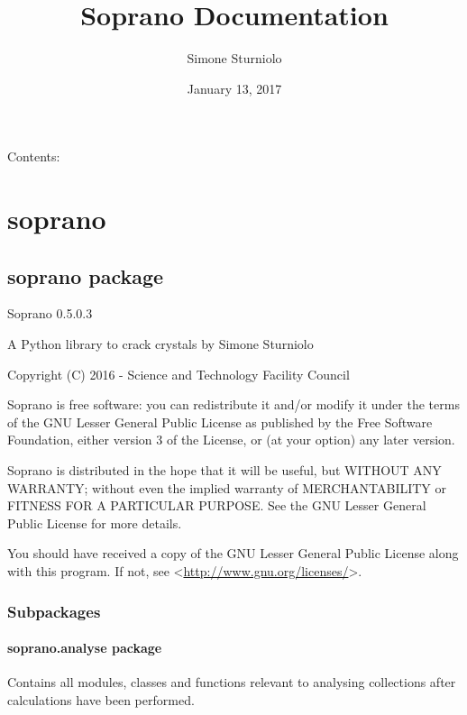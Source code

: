 \documentclass[letterpaper,10pt,english]{sphinxmanual}
\title{Soprano Documentation}
\date{January 13, 2017}
\author{Simone Sturniolo}
\begin{document}
\maketitle
\tableofcontents
{}\label{index::doc}


Contents:


\chapter{soprano}
\label{doctree/modules:welcome-to-soprano-s-documentation-release-release}\label{doctree/modules:soprano}\label{doctree/modules::doc}

\section{soprano package}
\label{doctree/soprano:module-soprano}\label{doctree/soprano::doc}\label{doctree/soprano:soprano-package}
Soprano 0.5.0.3

A Python library to crack crystals
by Simone Sturniolo

Copyright (C) 2016 - Science and Technology Facility Council

Soprano is free software: you can redistribute it and/or modify
it under the terms of the GNU Lesser General Public License as published by
the Free Software Foundation, either version 3 of the License, or
(at your option) any later version.

Soprano is distributed in the hope that it will be useful,
but WITHOUT ANY WARRANTY; without even the implied warranty of
MERCHANTABILITY or FITNESS FOR A PARTICULAR PURPOSE.  See the
GNU Lesser General Public License for more details.

You should have received a copy of the GNU Lesser General Public License
along with this program.  If not, see \textless{}\href{http://www.gnu.org/licenses/}{http://www.gnu.org/licenses/}\textgreater{}.


\subsection{Subpackages}
\label{doctree/soprano:subpackages}

\subsubsection{soprano.analyse package}
\label{doctree/soprano.analyse:module-soprano.analyse}\label{doctree/soprano.analyse:soprano-analyse-package}\label{doctree/soprano.analyse::doc}
Contains all modules, classes and functions relevant
to analysing collections after calculations have been performed.
\end{document}
